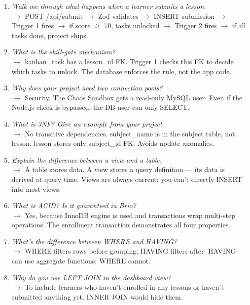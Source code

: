 \documentclass[11pt,a4paper]{article}
\begin{document}
\begin{enumerate}[nosep, leftmargin=2em, itemsep=2pt]
  \item \textit{Walk me through what happens when a learner submits a lesson.} \\
        $\to$ POST /api/submit $\to$ Zod validates $\to$ INSERT submission $\to$ Trigger 1 fires $\to$
        if score $\geq$ 70, tasks unlocked $\to$ Trigger 2 fires $\to$ if all tasks done, project ships.

  \item \textit{What is the skill-gate mechanism?} \\
        $\to$ kanban\_task has a lesson\_id FK. Trigger 1 checks this FK to decide which
        tasks to unlock. The database enforces the rule, not the app code.

  \item \textit{Why does your project need two connection pools?} \\
        $\to$ Security. The Chaos Sandbox gets a read-only MySQL user. Even if the Node.js
        check is bypassed, the DB user can only SELECT.

  \item \textit{What is 3NF? Give an example from your project.} \\
        $\to$ No transitive dependencies. subject\_name is in the subject table, not lesson.
        lesson stores only subject\_id FK. Avoids update anomalies.

  \item \textit{Explain the difference between a view and a table.} \\
        $\to$ A table stores data. A view stores a query definition — its data is derived
        at query time. Views are always current; you can't directly INSERT into most views.

  \item \textit{What is ACID? Is it guaranteed in Brio?} \\
        $\to$ Yes, because InnoDB engine is used and transactions wrap multi-step operations.
        The enrollment transaction demonstrates all four properties.

  \item \textit{What's the difference between WHERE and HAVING?} \\
        $\to$ WHERE filters rows before grouping; HAVING filters after. HAVING can use
        aggregate functions; WHERE cannot.

  \item \textit{Why do you use LEFT JOIN in the dashboard view?} \\
        $\to$ To include learners who haven't enrolled in any lessons or haven't submitted
        anything yet. INNER JOIN would hide them.


\end{enumerate}
\end{document}
